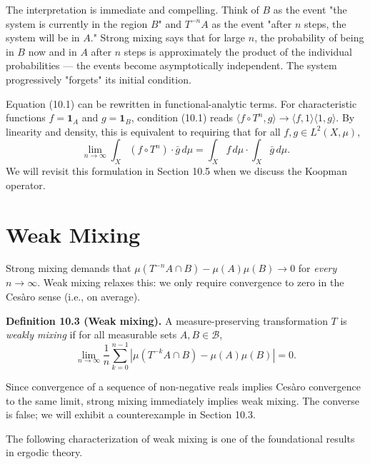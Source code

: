 The interpretation is immediate and compelling. Think of $B$ as the event "the system is currently in the region $B$" and $T^{-n}A$ as the event "after $n$ steps, the system will be in $A$." Strong mixing says that for large $n$, the probability of being in $B$ now and in $A$ after $n$ steps is approximately the product of the individual probabilities --- the events become asymptotically independent. The system progressively "forgets" its initial condition.

\begin{remark}
Equation (10.1) can be rewritten in functional-analytic terms. For characteristic functions $f = \mathbf{1}_A$ and $g = \mathbf{1}_B$, condition (10.1) reads $\langle f \circ T^n, g \rangle \to \langle f, 1\rangle \langle 1, g \rangle$. By linearity and density, this is equivalent to requiring that for all $f, g \in L^2(X, \mu)$,
\begin{equation}\label{eq:10.2}\tag{10.2}
\lim_{n \to \infty} \int_X (f \circ T^n) \cdot \bar{g} \, d\mu = \int_X f \, d\mu \cdot \int_X \bar{g} \, d\mu.
\end{equation}
We will revisit this formulation in Section 10.5 when we discuss the Koopman operator.
\end{remark}


\section{Weak Mixing}\label{sec:10.2}

Strong mixing demands that $\mu(T^{-n}A \cap B) - \mu(A)\mu(B) \to 0$ for \textit{every} $n \to \infty$. Weak mixing relaxes this: we only require convergence to zero in the Cesàro sense (i.e., on average).

\textbf{Definition 10.3 (Weak mixing).} A measure-preserving transformation $T$ is \textit{weakly mixing} if for all measurable sets $A, B \in \mathcal{B}$,
\begin{equation}\label{eq:10.3}\tag{10.3}
\lim_{n \to \infty} \frac{1}{n} \sum_{k=0}^{n-1} \left| \mu(T^{-k}A \cap B) - \mu(A)\mu(B) \right| = 0.
\end{equation}

Since convergence of a sequence of non-negative reals implies Cesàro convergence to the same limit, strong mixing immediately implies weak mixing. The converse is false; we will exhibit a counterexample in Section 10.3.

The following characterization of weak mixing is one of the foundational results in ergodic theory.

